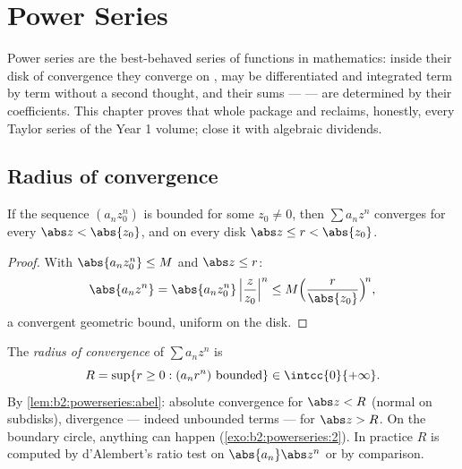 \chapter{Power Series}\label{ch:b2:powerseries}

Power series are the best-behaved series of functions in
mathematics: inside their disk of convergence they converge
 on , may be differentiated and integrated term by
term without a second thought, and their sums --- \emph{} --- are determined by their coefficients. This chapter
proves that whole package and reclaims, honestly, every Taylor
series of the Year 1 volume;  close it with
algebraic dividends.

\section{Radius of convergence}

\begin{lemma}[Abel]\label{lem:b2:powerseries:abel}
If the sequence $(a_n z_0^n)$ is bounded for some $z_0 \neq 0$,
then $\sum a_n z^n$ converges  for every $\abs z < \abs
{z_0}$, and  on every disk $\abs z \leq r < \abs{z_0}$.
\end{lemma}

\begin{proof}
With $\abs{a_n z_0^n} \leq M$ and $\abs z \leq r$:
\[
\abs{a_n z^n} = \abs{a_n z_0^n}\,\Bigl|\frac{z}{z_0}\Bigr|^n
\leq M\Bigl(\frac{r}{\abs{z_0}}\Bigr)^{\!n},
\]
a convergent geometric bound, uniform on the disk.
\end{proof}

\begin{definition}\label{def:b2:powerseries:radius}
The \emph{radius of convergence} of
$\sum a_n z^n$ is
\[
R = \sup\{r \geq 0 : (a_n r^n) \text{ bounded}\} \in
\intcc{0}{+\infty} .
\]
By \cref{lem:b2:powerseries:abel}: absolute convergence for $\abs
z < R$ (normal on  subdisks), divergence --- indeed unbounded
terms --- for $\abs z > R$. On the boundary circle, anything can
happen (\cref{exo:b2:powerseries:2}). In practice $R$ is computed
by d'Alembert's ratio test on $\abs{a_n}\abs z^n$ or by comparison.
\end{definition}

